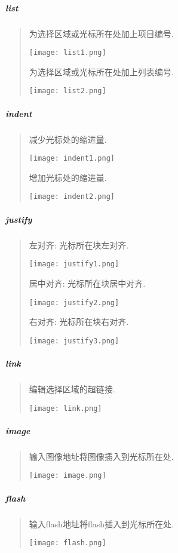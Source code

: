 \documentclass[letterpaper,10pt,english]{sphinxmanual}
\begin{document}
\subparagraph{list}
\label{relatedproj/editorguide/plugin:list}\begin{quote}

为选择区域或光标所在处加上项目编号.

\texttt{[image: list1.png]}

为选择区域或光标所在处加上列表编号.

\texttt{[image: list2.png]}
\end{quote}


\subparagraph{indent}
\label{relatedproj/editorguide/plugin:indent}\begin{quote}

减少光标处的缩进量.

\texttt{[image: indent1.png]}

增加光标处的缩进量.

\texttt{[image: indent2.png]}
\end{quote}


\subparagraph{justify}
\label{relatedproj/editorguide/plugin:justify}\begin{quote}

左对齐: 光标所在块左对齐.

\texttt{[image: justify1.png]}

居中对齐: 光标所在块居中对齐.

\texttt{[image: justify2.png]}

右对齐: 光标所在块右对齐.

\texttt{[image: justify3.png]}
\end{quote}


\subparagraph{link}
\label{relatedproj/editorguide/plugin:link}\begin{quote}

编辑选择区域的超链接.

\texttt{[image: link.png]}
\end{quote}


\subparagraph{image}
\label{relatedproj/editorguide/plugin:image}\begin{quote}

输入图像地址将图像插入到光标所在处.

\texttt{[image: image.png]}
\end{quote}


\subparagraph{flash}
\label{relatedproj/editorguide/plugin:flash}\begin{quote}

输入flash地址将flash插入到光标所在处.

\texttt{[image: flash.png]}
\end{quote}
\end{document}
